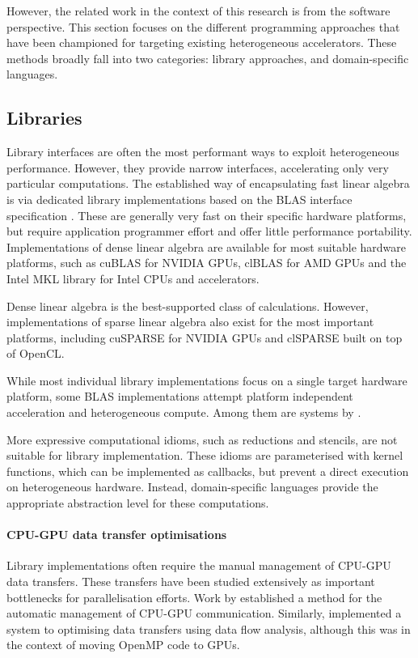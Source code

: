     However, the related work in the context of this research is from
    the software perspective.
    This section focuses on the different programming approaches that
    have been championed for targeting existing heterogeneous accelerators.
    These methods broadly fall into two categories: library approaches, and
    domain-specific languages.

\subsection{Libraries}

    Library interfaces are often the most performant ways to exploit
    heterogeneous performance.
    However, they provide narrow interfaces, accelerating only very particular
    computations.
    The established way of encapsulating fast linear algebra is via dedicated
    library implementations based on the BLAS interface specification
    \cite{2002:USB:567806.567807}.
    These are generally very fast on their specific hardware platforms, but
    require application programmer effort and offer little performance portability.
    Implementations of dense linear algebra are available for most suitable
    hardware platforms, such as cuBLAS \cite{cublas} for NVIDIA GPUs, clBLAS
    \cite{clblas} for AMD GPUs and the Intel MKL library \cite{mkl} for Intel
    CPUs and accelerators.

    Dense linear algebra is the best-supported class of calculations.
    However, implementations of sparse linear algebra also exist for
    the most important platforms, including cuSPARSE \cite{cusparse} for NVIDIA
    GPUs and clSPARSE \cite{clsparse} built on top of OpenCL.

    While most individual library implementations focus on a single target
    hardware platform, some BLAS implementations attempt platform independent
    acceleration and heterogeneous compute.
    Among them are systems by \citet{Wang:2016:BHP:2925426.2926256,
    10.1007/978-3-319-64203-1_33, Diego2017Multi}.

    More expressive computational idioms, such as reductions and stencils, are
    not suitable for library implementation.
    These idioms are parameterised with kernel functions, which can be
    implemented as callbacks, but prevent a direct execution on heterogeneous
    hardware.
    Instead, domain-specific languages provide the appropriate abstraction
    level for these computations.

    \paragraph*{CPU-GPU data transfer optimisations}
    Library implementations often require the manual management of CPU-GPU
    data transfers.
    These transfers have been studied extensively as important bottlenecks for
    parallelisation efforts.
    Work by \citet{Jablin:2011:ACC:1993316.1993516} established a
    method for the automatic management of CPU-GPU communication.
    Similarly, \citet{Lee:2009:OGC:1594835.1504194} implemented a system to
    optimising data transfers using data flow analysis, although this was in
    the context of moving OpenMP code to GPUs.

